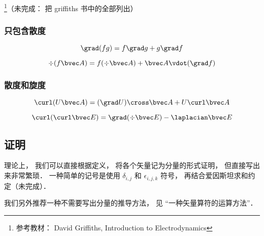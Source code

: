 
\footnote{参考教材： David Griffiths, Introduction to Electrodynamics}（未完成： 把 griffiths 书中的全部列出）

\subsubsection{只包含散度}
\begin{equation}
\grad (fg) = f\grad g + g \grad f
\end{equation}

\begin{equation}
\div (f \bvec A) = f (\div \bvec A) + \bvec A \vdot (\grad f)
\end{equation}

\subsubsection{散度和旋度}
\begin{equation}
\curl(U\bvec A) = (\grad U) \cross\bvec A + U \curl\bvec A
\end{equation}

\begin{equation}
\curl(\curl \bvec E) = \grad(\div\bvec E) - \laplacian \bvec E
\end{equation}

\subsection{证明}
理论上， 我们可以直接根据定义， 将各个矢量记为分量的形式证明， 但直接写出来非常繁琐． 一种简单的记号是使用 $\delta_{i,j}$ 和 $\epsilon_{i,j,k}$ 符号， 再结合爱因斯坦求和约定（未完成）．

我们另外推荐一种不需要写出分量的推导方法， 见 “一种矢量算符的运算方法”．
